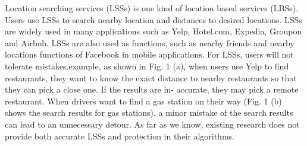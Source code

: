 \documentclass[a4paper,fleqn]{cas-dc}
\begin{document}
Location searching services (LSSs) is one kind of location based services (LBSs). Users use LSSs to search nearby location and distances to desired locations. LSSs are widely used in many applications such as Yelp, Hotel.com, Expedia, Groupon and Airbnb. LSSs are also used as functions, such as nearby friends and nearby locations functions of Facebook in mobile applications. For LSSs, users will not tolerate mistakes.example, as shown in Fig. 1 (a), when users use Yelp to find restaurants, they want to know the exact distance to nearby restaurants so that they can pick a close one. If the results are in- accurate, they may pick a remote restaurant. When drivers want to find a gas station on their way (Fig. 1 (b) shows the search results for gas stations), a minor mistake of the search results can lead to an unnecessary detour. As far as we know, existing research does not provide both accurate LSSs and protection in their algorithms.
\end{document}
